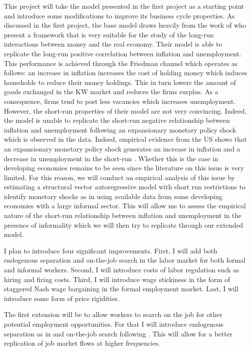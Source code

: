 \documentclass[12pt,a4paper,titlepage]{article}
\begin{document}
This project will take the model presented in the first project as a starting point and introduce some modifications to improve its business cycle properties. As discussed in the first project, the base model draws heavily from the work of \cite{Berentsen2011} who present a framework that is very suitable for the study of the long-run interactions between money and the real economy. Their model is able to replicate the long-run positive correlation between inflation and unemployment. This performance is achieved through the Friedman channel which operates as follows: an increase in inflation increases the cost of holding money which induces households to reduce their money holdings. This in turn lowers the amount of goods exchanged in the KW market and reduces the firms surplus. As a consequence, firms tend to post less vacancies which increases unemployment. However, the short-run properties of their model are not very convincing. Indeed, the model is unable to replicate the short-run negative relationship between inflation and unemployment following an expansionary monetary policy shock which is observed in the data. Indeed, empirical evidence from the US shows that an expansionary monetary policy shock generates an increase in inflation and a decrease in unemployment in the short-run  \citep{Christiano2005}. Whether this is the case in developing economies remains to be seen since the literature on this issue is very limited. For this reason, we will conduct an empirical analysis of this issue by estimating a structural vector autoregressive model with short run restrictions to identify monetary shocks as in \cite{Christiano2005} using available data from some developing economies with a large informal sector. This will allow me to assess the empirical nature of the short-run relationship between inflation and unemployment in the presence of informality which we will then try to replicate through our extended model.

I plan to introduce four significant improvements. First, I will add both endogenous separation and on-the-job search in the labor market for both formal and informal workers. Second, I will introduce costs of labor regulation such as hiring and firing costs. Third, I will introduce wage stickiness in the form of staggered Nash wage bargaining in the formal employment market. Last, I will introduce some form of price rigidities. 

The first extension will be to allow workers to search on the job for other potential employment opportunities. For that I will introduce endogenous separation as in \cite{Mortensen1994} and on-the-job search following \cite{Pissarides1994}. This will allow for a better replication of job market flows at higher frequencies.
\end{document}
